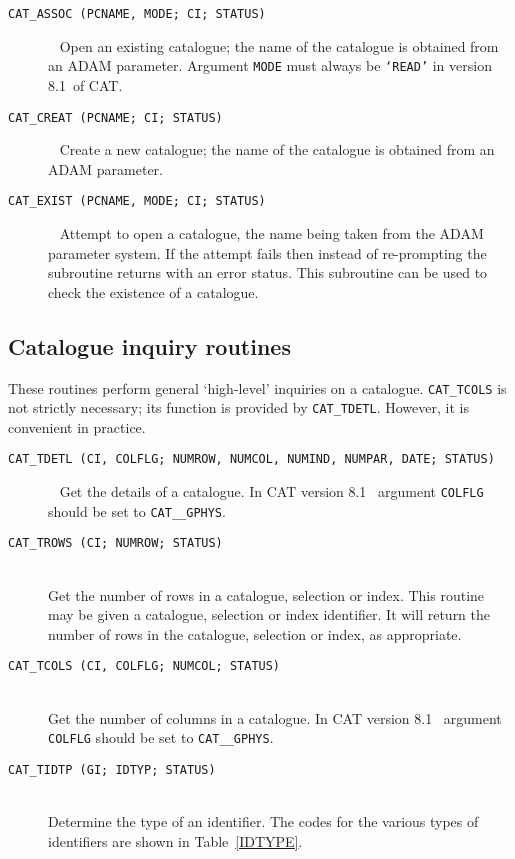 \documentclass[11pt,twoside]{starlink}
\providecommand{\CATversion}{8.1~}
\begin{document}
\begin{description}

  \item[ \texttt{CAT\_ASSOC (PCNAME, MODE; CI; STATUS) } ] ~
  \newline Open an existing catalogue; the name of the catalogue is
   obtained from an ADAM parameter. Argument \texttt{MODE} must always
   be \texttt{`READ'} in version \CATversion of CAT.

  \item[ \texttt{CAT\_CREAT (PCNAME; CI; STATUS) } ] ~
  \newline Create a new catalogue; the name of the catalogue is obtained
   from an ADAM parameter.

  \item[ \texttt{CAT\_EXIST (PCNAME, MODE; CI; STATUS) } ] ~
  \newline Attempt to open a catalogue, the name being taken from the
   ADAM parameter system. If the attempt fails then instead of
   re-prompting the subroutine returns with an error status. This
   subroutine can be used to check the existence of a catalogue.

\end{description}


\subsection{Catalogue inquiry routines}

These routines perform general `high-level' inquiries on a catalogue.
\texttt{CAT\_TCOLS} is not strictly necessary; its function is
provided by \texttt{CAT\_TDETL}. However, it is convenient in practice.

\begin{description}

  \item[ \texttt{CAT\_TDETL (CI, COLFLG; NUMROW, NUMCOL, NUMIND, NUMPAR,
   DATE; STATUS) } ] ~
  \newline Get the details of a catalogue. In CAT version \CATversion
   argument \texttt{COLFLG} should be set to \texttt{CAT\_\_GPHYS}.

  \item[ \texttt{CAT\_TROWS (CI; NUMROW; STATUS) } ] ~ \\
   Get the number of rows in a catalogue, selection or index. This
   routine may be given a catalogue, selection or index identifier.  It
   will return the number of rows in the catalogue, selection or index,
   as appropriate.

  \item[ \texttt{CAT\_TCOLS (CI, COLFLG; NUMCOL; STATUS) } ] ~ \\
   Get the number of columns in a catalogue. In CAT version \CATversion
   argument \texttt{COLFLG} should be set to \texttt{CAT\_\_GPHYS}.

  \item[ \texttt{CAT\_TIDTP (GI; IDTYP; STATUS) } ] ~ \\
   Determine the type of an identifier. The codes for the various types
   of identifiers are shown in Table~\ref{IDTYPE}.

\end{description}
\end{document}
